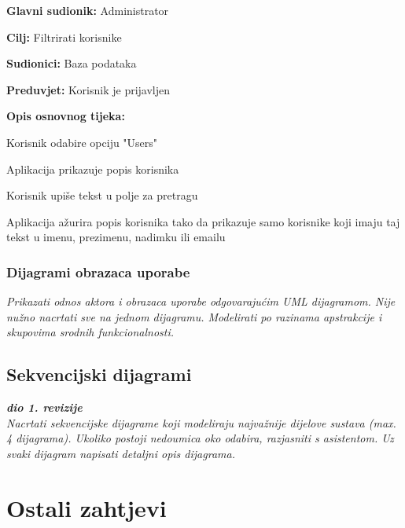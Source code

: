 					\noindent {}
					\begin{packed_item}

						\item \textbf{Glavni sudionik:} Administrator
						\item \textbf{Cilj:} Filtrirati korisnike
						\item \textbf{Sudionici:} Baza podataka
						\item \textbf{Preduvjet:} Korisnik je prijavljen
						\item \textbf{Opis osnovnog tijeka:}

						\item[] \begin{packed_enum}

							\item Korisnik odabire opciju "Users"
							\item Aplikacija prikazuje popis korisnika
							\item Korisnik upiše tekst u polje za pretragu
							\item Aplikacija ažurira popis korisnika tako da prikazuje samo korisnike koji imaju taj tekst u imenu, prezimenu, nadimku ili emailu
						\end{packed_enum}
					\end{packed_item}
					
				\subsubsection{Dijagrami obrazaca uporabe}
					
					\textit{Prikazati odnos aktora i obrazaca uporabe odgovarajućim UML dijagramom. Nije nužno nacrtati sve na jednom dijagramu. Modelirati po razinama apstrakcije i skupovima srodnih funkcionalnosti.}
				\eject		
				
			\subsection{Sekvencijski dijagrami}
				
				\textbf{\textit{dio 1. revizije}}\\
				
				\textit{Nacrtati sekvencijske dijagrame koji modeliraju najvažnije dijelove sustava (max. 4 dijagrama). Ukoliko postoji nedoumica oko odabira, razjasniti s asistentom. Uz svaki dijagram napisati detaljni opis dijagrama.}
				\eject
	
		\section{Ostali zahtjevi}
		
